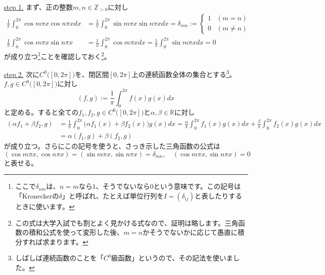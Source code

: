 \noindent \underline{step 1.}
まず、正の整数$m, n \in \mathbb{Z}_{>0}$に対し
\begin{align*}
\frac{1}{\pi}\int_0^{2\pi} \cos m\pi x \cos n\pi x dx &=
\frac{1}{\pi}\int_0^{2\pi} \sin m\pi x \sin n\pi x dx
= \delta_{mn} :=
\begin{cases}
1 & (m = n) \\
0 & (m \neq n)
\end{cases} \\
\frac{1}{\pi}\int_0^{2\pi} \cos m\pi x \sin n\pi x &= \frac{1}{\pi}\int_0^{2\pi} \cos m\pi x dx = \frac{1}{\pi}\int_0^{2\pi} \sin m \pi x dx = 0
\end{align*}
が成り立つ\footnote{ここで$\delta_{nm}$は、$n = m$なら$1$、そうでないなら$0$という意味です。この記号は「Kroneckerの$\delta$」と呼ばれ、たとえば単位行列を$I = (\delta_{ij})$と表したりするときに使います。}ことを確認しておく\footnote{この式は大学入試でも割とよく見かける式なので、証明は略します。三角函数の積和公式を使って変形した後、$m = n$かそうでないかに応じて愚直に積分すれば求まります。}。

\noindent \underline{step 2.} 次に$C^0\bigl([0, 2\pi]\bigr)$を、閉区間$[0, 2\pi]$上の連続函数全体の集合とする\footnote{しばしば連続函数のことを「$C^0$級函数」というので、その記法を使いました。}。$f, g \in C^0\bigl([0, 2\pi]\bigr)$に対し
\[
(f, g) := \frac{1}{\pi} \int_0^{2\pi} f(x) g(x) dx
\]
と定める。すると全ての$f_1, f_2, g \in C^0\bigl([0, 2\pi]\bigr)$と$\alpha, \beta\in\mathbb{R}$に対し
\begin{align*}
(\alpha f_1 + \beta f_2, g)
&=
\frac{1}{\pi} \int_0^{2\pi} \bigl(\alpha f_1(x) + \beta f_2(x)\bigr) g(x) dx
= \frac{\alpha}{\pi} \int_0^{2\pi} f_1(x) g(x) dx + \frac{\beta}{\pi} \int_0^{2\pi} f_2(x) g(x) dx \\
&= \alpha(f_1, g) + \beta(f_2, g)
\end{align*}
が成り立つ。さらにこの記号を使うと、さっき示した三角函数の公式は
\[
(\cos m\pi x , \cos n \pi x ) = (\sin m \pi x, \sin n \pi x) = \delta_{mn},\quad (\cos m\pi x, \sin n\pi x) = 0
\]
と表せる。

